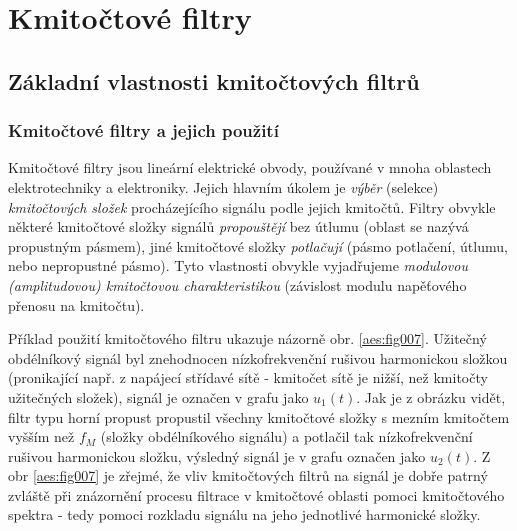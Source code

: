 {
\chapter{Kmitočtové filtry}
\minitoc

  \section{Základní vlastnosti kmitočtových filtrů}
    \subsection{Kmitočtové filtry a jejich použití}
      Kmitočtové filtry jsou lineární elektrické obvody, používané v mnoha oblastech elektrotechniky
      a elektroniky. Jejich hlavním úkolem je \emph{výběr} (selekce) \emph{kmitočtových složek}
      procházejícího signálu podle jejich kmitočtů. Filtry obvykle některé kmitočtové složky signálů
      \emph{propouštějí} bez útlumu (oblast se nazývá propustným pásmem), jiné kmitočtové složky
      \emph{potlačují} (pásmo potlačení, útlumu, nebo nepropustné pásmo). Tyto vlastnosti obvykle
      vyjadřujeme \emph{modulovou (amplitudovou) kmitočtovou charakteristikou} (závislost modulu
      napěťového přenosu na kmitočtu).

      Příklad použití kmitočtového filtru ukazuje názorně obr. \ref{aes:fig007}. Užitečný 
      obdélníkový signál byl znehodnocen níz\-ko\-frek\-ven\-ční rušivou harmonickou složkou 
      (pronikající např. z napájecí střídavé sítě - kmitočet sítě je nižší, než kmitočty užitečných 
      složek), signál je označen v grafu jako \(u_1(t)\). Jak je z obrázku vidět, filtr typu horní 
      propust propustil všechny kmitočtové složky s mezním kmitočtem vyšším než \(f_M\) (složky 
      obdélníkového signálu) a potlačil tak nízkofrekvenční rušivou harmonickou složku, výsledný 
      signál je v grafu označen jako \(u_2(t)\). Z obr \ref{aes:fig007} je zřejmé, že vliv 
      kmitočtových filtrů na signál je dobře patrný zvláště při znázornění procesu filtrace v 
      kmitočtové oblasti pomoci kmitočtového spektra - tedy pomoci rozkladu signálu na jeho 
      jednotlivé harmonické složky.

}
